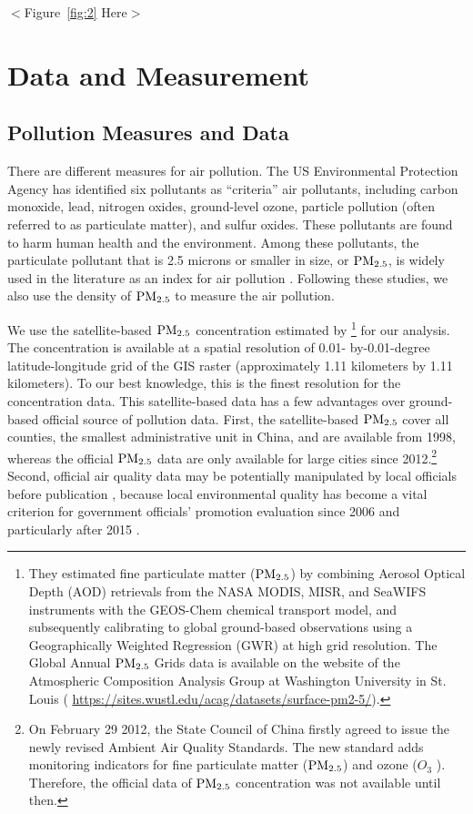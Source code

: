 \documentclass[12pt]{article}
\begin{document}
  \begin{center}
    $<$Figure~\ref{fig:2} Here$>$
    \end{center}

\section{Data and Measurement} \label{sec:3}
\subsection{Pollution Measures and Data}  \label{sec:3.1}
There are different measures for air pollution. The US Environmental Protection Agency has identified six pollutants as ``criteria'' air pollutants, including carbon monoxide, lead, nitrogen oxides, ground-level ozone, particle pollution (often referred to as particulate matter), and sulfur oxides. These pollutants are found to harm human health and the environment. Among these pollutants, the particulate pollutant that is 2.5 microns or smaller in size, or $\rm PM_{2.5}$, is widely used in the literature as an index for air pollution \citep{fu2021air,khanna2021productivity}. Following these studies, we also use the density of $\rm PM_{2.5}$ to measure the air pollution. 

We use the satellite-based $\rm PM_{2.5}$ concentration estimated by \cite{van2021monthly}\footnote{%
    They estimated fine particulate matter ($\rm PM_{2.5}$) by combining Aerosol Optical
    Depth (AOD) retrievals from the NASA MODIS, MISR, and SeaWIFS instruments
    with the GEOS-Chem chemical transport model, and subsequently calibrating to
    global ground-based observations using a Geographically Weighted Regression
    (GWR) at high grid resolution. The Global
    Annual $\rm PM_{2.5}$ Grids data is available on the website of the Atmospheric Composition Analysis Group at Washington University in St. Louis ( \url{https://sites.wustl.edu/acag/datasets/surface-pm2-5/}).} for our analysis. The concentration is available at a spatial resolution of 0.01- by-0.01-degree latitude-longitude grid of the GIS raster (approximately 1.11 kilometers by 1.11 kilometers). To our best knowledge, this is the finest resolution for the concentration data. This satellite-based data has a few advantages 
   over ground-based official source of pollution data. First, the satellite-based
    $\rm PM_{2.5}$ cover all counties, the smallest administrative unit in China, and are available from 1998, whereas the official $\rm PM_{2.5}$ data are only available for large cities since
    2012.\footnote{On February 29 2012, the State Council of China firstly agreed to issue the
    newly revised Ambient Air Quality Standards. The new standard adds monitoring indicators for fine particulate matter ($\rm PM_{2.5}$) and ozone ($O_{3}$%
    ). Therefore, the official data of $\rm PM_{2.5}$ concentration was not available until then.} Second, official air quality data may be potentially manipulated by
    local officials before publication \citep{ghanem2014effortless,andrews2008inconsistencies},  because local environmental quality
has become a vital criterion for government officials’ promotion evaluation since 2006 and particularly after 2015 \citep{Fan2022}. 
\end{document}
